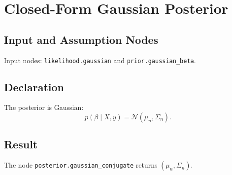 \section{Closed-Form Gaussian Posterior}
\label{posterior:gaussian-conjugate}

\subsection{Input and Assumption Nodes}
Input nodes: \texttt{likelihood.gaussian} and \texttt{prior.gaussian\_beta}.

\subsection{Declaration}
The posterior is Gaussian:
\[
  p(\beta\mid X,y)=\mathcal{N}(\mu_n,\Sigma_n).
\]

\subsection{Result}
The node \texttt{posterior.gaussian\_conjugate} returns \((\mu_n,\Sigma_n)\).

